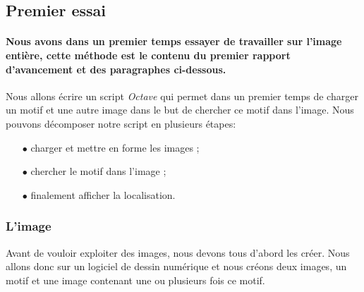 \documentclass[a4paper,12pt,titlepage]{report}
\newcommand{\octave}{\textit{Octave }}
\begin{document}
		\subsection{Premier essai}
		\paragraph*{Nous avons dans un premier temps essayer de travailler sur l'image entière, cette méthode est le contenu du premier rapport d'avancement et des paragraphes ci-dessous.}
				
		Nous allons écrire un script \octave qui permet dans un premier temps de charger un motif et une autre image dans le but de chercher ce motif dans l'image. Nous pouvons décomposer notre script en plusieurs étapes:
		\begin{itemize}
			\item[$\bullet$] charger et mettre en forme les images ;
			\item[$\bullet$] chercher le motif dans l'image ;
			\item[$\bullet$] finalement afficher la localisation.
		\end{itemize}	   
		\subsubsection{L'image}
		Avant de vouloir exploiter des images, nous devons tous d'abord les créer. Nous allons donc sur un logiciel de dessin numérique et nous créons deux images, un motif et une image contenant une ou plusieurs fois ce motif.
			
\end{document}

